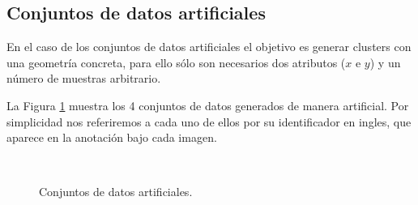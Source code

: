 \subsection{Conjuntos de datos artificiales}

En el caso de los conjuntos de datos artificiales el objetivo es generar clusters con una geometría concreta, para ello sólo son necesarios dos atributos ($x$ e $y$) y un número de muestras arbitrario.

La Figura \ref{fig:figure22} muestra los 4 conjuntos de datos generados de manera artificial. Por simplicidad nos referiremos a cada uno de ellos por su identificador en ingles, que aparece en la anotación bajo cada imagen.

\begin{figure}[bth]
	\myfloatalign
	\\
	\caption{Conjuntos de datos artificiales.}\label{fig:figure22}
\end{figure}

